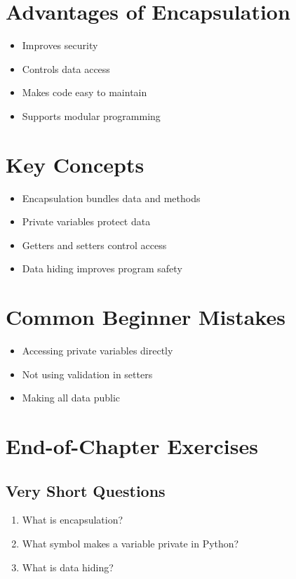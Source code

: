 \section{Advantages of Encapsulation}

\begin{itemize}
    \item Improves security
    \item Controls data access
    \item Makes code easy to maintain
    \item Supports modular programming
\end{itemize}

\section{Key Concepts}

\begin{itemize}
    \item Encapsulation bundles data and methods
    \item Private variables protect data
    \item Getters and setters control access
    \item Data hiding improves program safety
\end{itemize}

\section{Common Beginner Mistakes}

\begin{itemize}
    \item Accessing private variables directly
    \item Not using validation in setters
    \item Making all data public
\end{itemize}

\section{End-of-Chapter Exercises}

\subsection{Very Short Questions}

\begin{enumerate}
    \item What is encapsulation?
    \item What symbol makes a variable private in Python?
    \item What is data hiding?
\end{enumerate}

